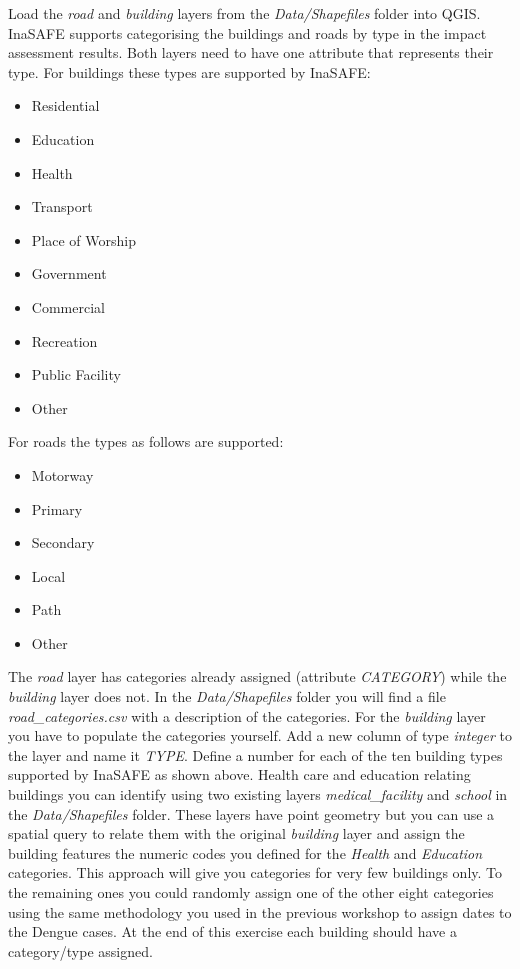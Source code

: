 \documentclass[a4paper,12pt,titlepage]{article}
\begin{document}
Load the \textit{road} and \textit{building} layers from the \textit{Data/Shapefiles} folder into QGIS. InaSAFE supports categorising the buildings and roads by type in the impact assessment results. Both layers need to have one attribute that represents their type. For buildings these types are supported by InaSAFE:

\begin{itemize}
	\item Residential
	\item Education
	\item Health
	\item Transport
	\item Place of Worship
	\item Government
	\item Commercial
	\item Recreation
	\item Public Facility
	\item Other
\end{itemize} 

For roads the types as follows are supported:

\begin{itemize}
	\item Motorway
	\item Primary
	\item Secondary
	\item Local
	\item Path
	\item Other
\end{itemize}

The \textit{road} layer has categories already assigned (attribute \textit{CATEGORY}) while the \textit{building} layer does not. In the \textit{Data/Shapefiles} folder you will find a file \textit{road\_categories.csv} with a description of the categories. For the \textit{building} layer you have to populate the categories yourself. Add a new column of type \textit{integer} to the layer and name it \textit{TYPE}. Define a number for each of the ten building types supported by InaSAFE as shown above. Health care and education relating buildings you can identify using two existing layers \textit{medical\_facility} and \textit{school} in the \textit{Data/Shapefiles} folder. These layers have point geometry but you can use a spatial query to relate them with the original \textit{building} layer and assign the building features the numeric codes you defined for the \textit{Health} and \textit{Education} categories. This approach will give you categories for very few buildings only. To the remaining ones you could randomly assign one of the other eight categories using the same methodology you used in the previous workshop to assign dates to the Dengue cases. At the end of this exercise each building should have a category/type assigned.
\end{document}
